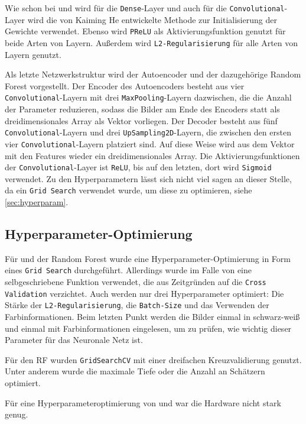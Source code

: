Wie schon bei \PreDog und \PreBig wird für die \texttt{Dense}-Layer und auch
für die \texttt{Convolutional}-Layer wird die von Kaiming He entwickelte Methode
zur Initialisierung der Gewichte verwendet. Ebenso wird \texttt{PReLU} als
Aktivierungsfunktion genutzt für beide Arten von Layern. Außerdem wird
\texttt{L2-Regularisierung} für alle Arten von Layern genutzt.

Als letzte Netzwerkstruktur wird der Autoencoder und der dazugehörige Random
Forest vorgestellt. Der Encoder des Autoencoders besteht aus vier
\texttt{Convolutional}-Layern mit drei \texttt{MaxPooling}-Layern dazwischen,
die die Anzahl der Parameter reduzieren, sodass die Bilder am Ende des Encoders
statt als dreidimensionales Array als Vektor vorliegen. Der Decoder besteht aus
fünf \texttt{Convolutional}-Layern und drei \texttt{UpSampling2D}-Layern, die
zwischen den ersten vier \texttt{Convolutional}-Layern platziert sind. Auf diese
Weise wird aus dem Vektor mit den Features wieder ein dreidimensionales Array.
Die Aktivierungsfunktionen der \texttt{Convolutional}-Layer ist \texttt{ReLU},
bis auf den letzten, dort wird \texttt{Sigmoid} verwendet. Zu den
Hyperparametern lässt sich nicht viel sagen an dieser Stelle, da ein
\texttt{Grid Search} verwendet wurde, um diese zu optimieren, siehe
\autoref{sec:hyperparam}.

\subsection{Hyperparameter-Optimierung}
\label{sec:hyperparam}
Für \MiniDog und der Random Forest wurde eine Hyperparameter-Optimierung in Form
eines \texttt{Grid Search} durchgeführt. Allerdings wurde im Falle von \MiniDog
eine selbgeschriebene Funktion verwendet, die aus Zeitgründen auf die
\texttt{Cross Validation} verzichtet. Auch werden nur drei Hyperparameter
optimiert: Die Stärke der \texttt{L2-Re\-gu\-la\-ri\-sier\-ung}, die
\texttt{Batch-Size} und das Verwenden der Farbinformationen. Beim letzten Punkt
werden die Bilder einmal in schwarz-weiß und einmal mit Farbinformationen
eingelesen, um zu prüfen, wie wichtig dieser Parameter für das Neuronale Netz
ist.

Für den RF wurden \texttt{GridSearchCV} mit einer dreifachen Kreuzvalidierung genutzt.
Unter anderem wurde die maximale Tiefe oder die Anzahl an Schätzern optimiert.


Für eine Hyperparameteroptimierung von \PreBig und \PreDog war die Hardware nicht stark genug.
